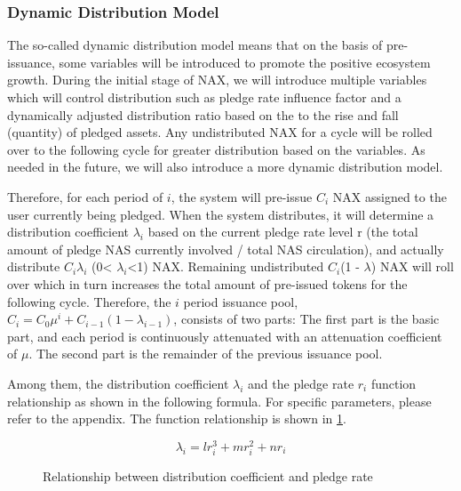 \subsubsection{Dynamic Distribution Model}
The so-called dynamic distribution model means that on the basis of pre-issuance, some variables will be introduced to promote the positive ecosystem growth. During the initial stage of NAX, we will introduce multiple variables which will control distribution such as pledge rate influence factor and a dynamically adjusted  distribution ratio based on the to the rise and fall (quantity) of pledged assets. Any undistributed NAX for a cycle will be rolled over to the following cycle for greater distribution based on the variables. As needed in the future, we will also introduce a more dynamic distribution model.

Therefore, for each period of $i$, the system will pre-issue $C_i$ NAX assigned to the user currently being pledged. When the system distributes, it will determine a distribution coefficient $\lambda_i$ based on the current pledge rate level r (the total amount of pledge NAS currently involved / total NAS circulation), and actually distribute $C_i$$\lambda_i$ (0< $\lambda_i$<1) NAX. Remaining undistributed $C_i$(1 - $\lambda$) NAX will roll over which in turn increases the total amount of pre-issued tokens for the following cycle. Therefore, the \(i\) period issuance pool, \(C_i = C_0 \mu^i + C_{i-1} (1-\lambda_{i-1})\), consists of two parts: The first part is the basic part, and each period is continuously attenuated with an attenuation coefficient of $\mu$. The second part is the remainder of the previous issuance pool.

Among them, the distribution coefficient \(\lambda_i\) and the pledge rate \(r_i\) function relationship as shown in the following formula. For specific parameters, please refer to the appendix. The function relationship is shown in \ref{func}.

  \begin{equation}
    \lambda_i = l r_i^3 + m r_i^2 + n r_i
  \end{equation}

\begin{figure}
\centering
    \caption{Relationship between distribution coefficient and pledge rate}\label{func}
\end{figure}



